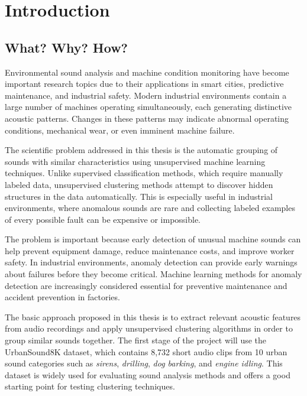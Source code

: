 \documentclass[runningheads,a4paper,11pt]{report}
\begin{document}
\chapter{Introduction}
\label{chapter:introduction}

\section{What? Why? How?}
\label{section:what}

Environmental sound analysis and machine condition monitoring have become important research topics due to their applications in smart cities, predictive maintenance, and industrial safety. Modern industrial environments contain a large number of machines operating simultaneously, each generating distinctive acoustic patterns. Changes in these patterns may indicate abnormal operating conditions, mechanical wear, or even imminent machine failure.

The scientific problem addressed in this thesis is the automatic grouping of sounds with similar characteristics using unsupervised machine learning techniques. Unlike supervised classification methods, which require manually labeled data, unsupervised clustering methods attempt to discover hidden structures in the data automatically. This is especially useful in industrial environments, where anomalous sounds are rare and collecting labeled examples of every possible fault can be expensive or impossible.

The problem is important because early detection of unusual machine sounds can help prevent equipment damage, reduce maintenance costs, and improve worker safety. In industrial environments, anomaly detection can provide early warnings about failures before they become critical. Machine learning methods for anomaly detection are increasingly considered essential for preventive maintenance and accident prevention in factories.

The basic approach proposed in this thesis is to extract relevant acoustic features from audio recordings and apply unsupervised clustering algorithms in order to group similar sounds together. The first stage of the project will use the UrbanSound8K dataset, which contains 8,732 short audio clips from 10 urban sound categories such as \textit{sirens}, \textit{drilling}, \textit{dog barking}, and \textit{engine idling}. This dataset is widely used for evaluating sound analysis methods and offers a good starting point for testing clustering techniques. 
\end{document}
